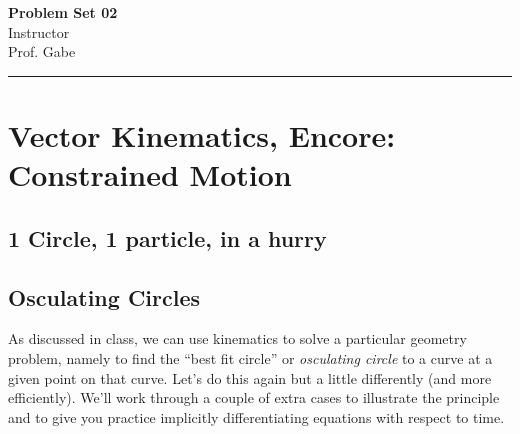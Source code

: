 \documentclass[12pt]{article}
\newif\ifshow
\begin{document}
\begin{center}
\ifshow
  \textbf{\Large Problem Set 02 Solution}\\
\else
  \textbf{\Large Problem Set 02}\\
\fi
Instructor \\ Prof. Gabe\\
\end{center}

\hrule

\vspace{0.2cm}

\section{Vector Kinematics, Encore: Constrained Motion}

\subsection{1 Circle, 1 particle, in a hurry}


\subsection{Osculating Circles}
As discussed in class, we can use kinematics to solve a particular geometry problem, namely to find the “best fit circle” or \textit{osculating circle} to a curve at a given point on that curve. Let’s do this again but a little differently (and more efficiently). We’ll work through a couple of extra cases to illustrate the principle and to give you practice implicitly differentiating equations with respect to time.
\end{document}
